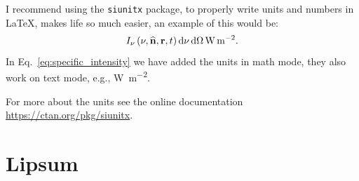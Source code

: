\documentclass[
    10pt,
    a4paper,
    ]{article}
\begin{document}
I recommend using the \texttt{siunitx} package, to properly write units and numbers in \LaTeX, makes life so much easier, an example of this would be:
\begin{equation}
    I_\nu\del{\nu,\widehat{\mathbf{n}}, \mathbf{r}, t}\dif\nu\dif\Omega \, \unit{\watt\per\m\squared}.
    \label{eq:specific_intensity}
\end{equation}
In Eq.~\eqref{eq:specific_intensity} we have added the units in math mode, they also work on text mode, e.g., \unit{\watt\per\m\squared}. 

For more about the units see the online documentation \url{https://ctan.org/pkg/siunitx}.

\section{Lipsum}
\lipsum[2-4]



\end{document}
